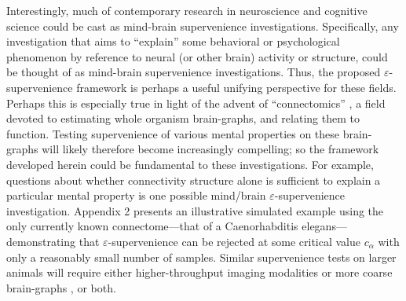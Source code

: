 \documentclass{article}
\newcommand{\eps}{\varepsilon}
\begin{document}
Interestingly, much of contemporary research in neuroscience and cognitive science could be cast as mind-brain supervenience investigations.  Specifically, any investigation that aims to ``explain'' some behavioral or psychological phenomenon by reference to neural (or other brain) activity or structure, could be thought of as mind-brain supervenience investigations.  Thus, the proposed $\eps$-supervenience framework is perhaps a useful unifying perspective for these fields.  Perhaps this is especially true in light of the advent of ``connectomics'' \cite{SpornsKotter05,Hagmann05}, a field devoted to estimating whole organism brain-graphs, and relating them to function.  Testing supervenience of various mental properties on these brain-graphs will likely therefore become increasingly compelling; so the framework developed herein could be fundamental to these investigations.  
For example, questions about whether connectivity structure alone is sufficient to explain a particular mental property is one possible mind/brain $\eps$-supervenience investigation.  Appendix 2 presents an illustrative simulated example using the only currently known connectome---that of a Caenorhabditis elegans---demonstrating that $\eps$-supervenience can be rejected at some critical value $c_\alpha$ with only a reasonably small number of samples. Similar supervenience tests on larger animals will require either higher-throughput imaging modalities \cite{HayworthLichtman06, Bock2011} or more coarse brain-graphs \cite{PalmAmunts10,Johansen-Berg2009}, or both.




\end{document}
